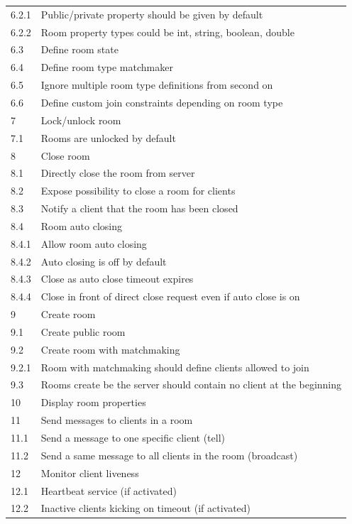 \begin{center}
\begin{longtable}{|l|l|}
6.2.1     & Public/private property should be given by default \\
6.2.2     & Room property types could be int, string, boolean, double \\ 
6.3       & Define room state \\
6.4       & Define room type matchmaker \\
6.5       & Ignore multiple room type definitions from second on \\
6.6       & Define custom join constraints depending on room type \\
7         & Lock/unlock room \\
7.1       & Rooms are unlocked by default \\
8         & Close room \\
8.1       & Directly close the room from server \\
8.2       & Expose possibility to close a room for clients \\
8.3       & Notify a client that the room has been closed \\
8.4       & Room auto closing \\
8.4.1     & Allow room auto closing \\
8.4.2     & Auto closing is off by default \\
8.4.3     & Close as auto close timeout expires \\
8.4.4     & Close in front of direct close request even if auto close is on \\
9         & Create room \\
9.1       & Create public room \\
9.2       & Create room with matchmaking \\
9.2.1     & Room with matchmaking should define clients allowed to join \\
9.3       & Rooms create be the server should contain no client at the beginning \\
10        & Display room properties \\
11        & Send messages to clients in a room \\
11.1      & Send a message to one specific client (tell) \\
11.2      & Send a same message to all clients in the room (broadcast) \\
12        & Monitor client liveness \\
12.1      & Heartbeat service (if activated) \\
12.2      & Inactive clients kicking on timeout (if activated) \\

\end{longtable}
\end{center}
